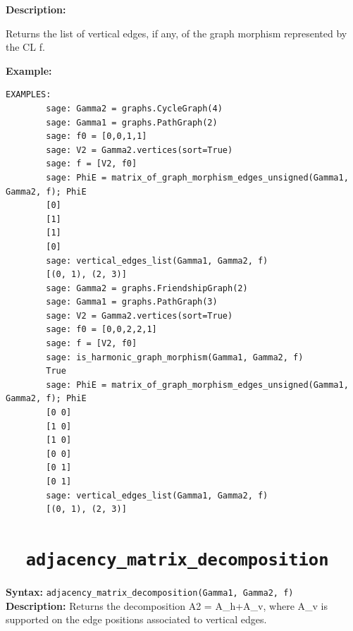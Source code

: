 \documentclass{article}
\begin{document}
\textbf{Description:}

Returns the list of vertical edges, if any, of the graph morphism represented by the CL f.

\textbf{Example:}
\begin{verbatim}
EXAMPLES:
        sage: Gamma2 = graphs.CycleGraph(4)    
        sage: Gamma1 = graphs.PathGraph(2)       
        sage: f0 = [0,0,1,1]          
        sage: V2 = Gamma2.vertices(sort=True) 
        sage: f = [V2, f0]    
        sage: PhiE = matrix_of_graph_morphism_edges_unsigned(Gamma1, Gamma2, f); PhiE 
        [0]
        [1]
        [1]
        [0]
        sage: vertical_edges_list(Gamma1, Gamma2, f) 
        [(0, 1), (2, 3)]
        sage: Gamma2 = graphs.FriendshipGraph(2)                                           
        sage: Gamma1 = graphs.PathGraph(3)                                                 
        sage: V2 = Gamma2.vertices(sort=True)                                                       
        sage: f0 = [0,0,2,2,1]                                                             
        sage: f = [V2, f0]                                                                 
        sage: is_harmonic_graph_morphism(Gamma1, Gamma2, f)                                
        True
        sage: PhiE = matrix_of_graph_morphism_edges_unsigned(Gamma1, Gamma2, f); PhiE      
        [0 0]
        [1 0]
        [1 0]
        [0 0]
        [0 1]
        [0 1]
        sage: vertical_edges_list(Gamma1, Gamma2, f)                                       
        [(0, 1), (2, 3)]
\end{verbatim}

\section{\tt \ \ adjacency\_matrix\_decomposition}

\textbf{Syntax:} \verb}adjacency_matrix_decomposition(Gamma1, Gamma2, f)}\\

\textbf{Description:}
Returns the decomposition A2 = A\_h+A\_v, where A\_v is supported on the edge positions
associated to vertical edges.
\end{document}
